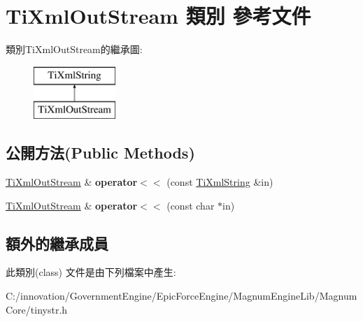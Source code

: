 \hypertarget{class_ti_xml_out_stream}{}\section{Ti\+Xml\+Out\+Stream 類別 參考文件}
\label{class_ti_xml_out_stream}
類別\+Ti\+Xml\+Out\+Stream的繼承圖\+:\begin{figure}[H]
\begin{center}
\leavevmode
\includegraphics[height=2.000000cm]{class_ti_xml_out_stream}
\end{center}
\end{figure}
\subsection*{公開方法(Public Methods)}
\begin{DoxyCompactItemize}
\item 
\hyperlink{class_ti_xml_out_stream}{Ti\+Xml\+Out\+Stream} \& {\bfseries operator$<$$<$} (const \hyperlink{class_ti_xml_string}{Ti\+Xml\+String} \&in)\hypertarget{class_ti_xml_out_stream_a3640dcb1c0903be3bc6966cdc9a79db6}{}\label{class_ti_xml_out_stream_a3640dcb1c0903be3bc6966cdc9a79db6}

\item 
\hyperlink{class_ti_xml_out_stream}{Ti\+Xml\+Out\+Stream} \& {\bfseries operator$<$$<$} (const char $\ast$in)\hypertarget{class_ti_xml_out_stream_af2117e5a8cbfcb69544804ad2859bfb6}{}\label{class_ti_xml_out_stream_af2117e5a8cbfcb69544804ad2859bfb6}

\end{DoxyCompactItemize}
\subsection*{額外的繼承成員}


此類別(class) 文件是由下列檔案中產生\+:\begin{DoxyCompactItemize}
\item 
C\+:/innovation/\+Government\+Engine/\+Epic\+Force\+Engine/\+Magnum\+Engine\+Lib/\+Magnum\+Core/tinystr.\+h\end{DoxyCompactItemize}
